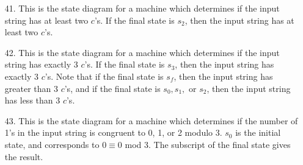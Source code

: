 \documentclass[letterpaper]{article}
\begin{document}
\begin{enumerate}
\item[41.] This is the state diagram for a machine which determines if the input string has at least two $c$'s. If the final state is $s_2$, then the input string has at least two $c$'s.


\item[42.] This is the state diagram for a machine which determines if the input string has exactly 3 $c$'s. If the final state is $s_3$, then the input string has exactly 3 $c$'s. Note that if the final state is $s_f$, then the input string has greater than 3 $c$'s, and if the final state is $s_0, s_1,$ or $s_2$, then the input string has less than 3 $c$'s. 


\item[43.] This is the state diagram for a machine which determines if the number of 1's in the input string is congruent to 0, 1, or 2 modulo 3. $s_0$ is the initial state, and corresponds to $0\equiv 0$ mod 3. The subscript of the final state gives the result. 




\end{enumerate}
\end{document}
